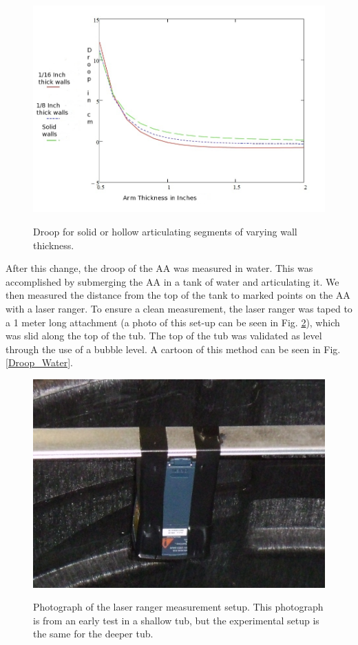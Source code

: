 \begin{figure}
\caption{Droop for solid or hollow articulating segments of varying wall thickness.}
\includegraphics[width=\textwidth]{AA/Calculated_Droop.jpg}
\label{Calculated_Droop}
\end{figure}


After this change, the droop of the AA was measured in water. This was accomplished by submerging the AA in a tank of water and articulating it. We then measured the distance from the top of the tank to marked points on the AA with a laser ranger. To ensure a clean measurement, the laser ranger was taped to a 1 meter long attachment (a photo of this set-up can be seen in Fig. \ref{Laser_Stick}), which was slid along the top of the tub. The top of the tub was validated as level through the use of a bubble level. A cartoon of this method can be seen in Fig. \ref{Droop_Water}.

\begin{figure}
\caption{Photograph of the laser ranger measurement setup. This photograph is from an early test in a shallow tub, but the experimental setup is the same for the deeper tub.}
\includegraphics[width= .5 \textwidth]{AA/Laser_Stick.jpg}
\label{Laser_Stick}
\end{figure}

